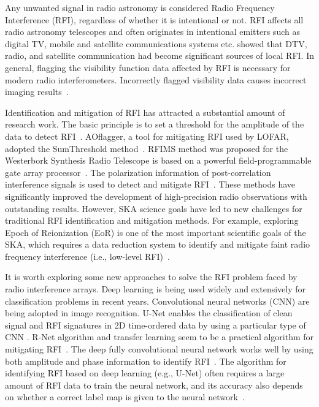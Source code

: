 \documentclass[usenatbib]{mnras}
\begin{document}
Any unwanted signal in radio astronomy is considered Radio Frequency Interference (RFI), regardless of whether it is intentional or not. RFI affects all radio astronomy telescopes and often originates in intentional emitters such as digital TV, mobile and satellite communications systems etc.
\citep{offringa2015low} showed that DTV, radio, and satellite communication had become significant sources of local RFI.  In general, flagging the visibility function data affected by RFI is necessary for modern radio interferometers. Incorrectly flagged visibility data causes incorrect imaging results~\citep{perley2003evla}. 

Identification and mitigation of RFI has attracted a substantial amount of research work. The basic principle is to set a threshold for the amplitude of the data to detect RFI~\citep{parsons2014new}. AOflagger, a tool for mitigating RFI used by LOFAR, adopted the SumThreshold method~\citep{offringa2010lofar}. RFIMS method was proposed for the Westerbork Synthesis Radio Telescope is based on a powerful field-programmable gate array processor~\citep{baan2004radio}. The polarization information of post-correlation interference signals is used to detect and mitigate RFI~\citep{yatawatta2021polarization}. These methods have significantly improved the development of high-precision radio observations with outstanding results. However, SKA science goals have led to new challenges for traditional RFI identification and mitigation methods. For example, exploring Epoch of Reionization (EoR) is one of the most important scientific goals of the SKA, which requires a data reduction system to identify and mitigate faint radio frequency interference (i.e., low-level RFI)~\citep{offringa2019impact}. 

It is worth exploring some new approaches to solve the RFI problem faced by radio interference arrays. 
Deep learning is being used widely and extensively for classification problems in recent years. Convolutional neural networks (CNN) are being adopted in image recognition. U-Net enables the classification of clean signal and RFI signatures in 2D time-ordered data by using a particular type of CNN \citep{akeret2017radio}. R-Net algorithm and transfer learning seem to be a practical algorithm for mitigating RFI~\citep{vafaei2020deep}. The deep fully convolutional neural network works well by using both amplitude and phase information to identify RFI~\citep{kerrigan2019optimizing}. The algorithm for identifying RFI based on deep learning (e.g., U-Net) often requires a large amount of RFI data to train the neural network, and its accuracy also depends on whether a correct label map is given to the neural network~\citep{vafaei2020deep}.
\end{document}
